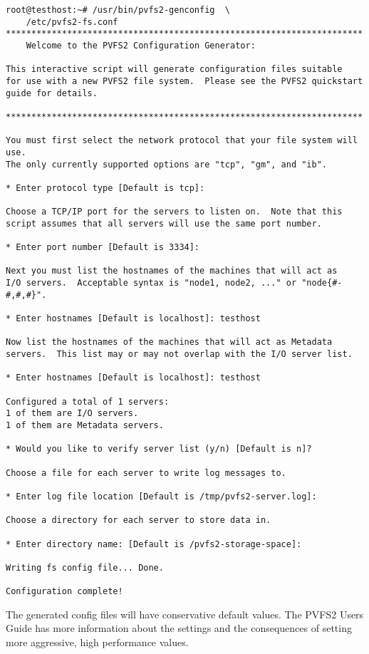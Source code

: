 \documentclass[11pt, letterpaper]{article}
\begin{document}
\begin{verbatim}
root@testhost:~# /usr/bin/pvfs2-genconfig  \
	/etc/pvfs2-fs.conf
**********************************************************************
	Welcome to the PVFS2 Configuration Generator:

This interactive script will generate configuration files suitable
for use with a new PVFS2 file system.  Please see the PVFS2 quickstart
guide for details.

**********************************************************************

You must first select the network protocol that your file system will use.
The only currently supported options are "tcp", "gm", and "ib".

* Enter protocol type [Default is tcp]: 

Choose a TCP/IP port for the servers to listen on.  Note that this
script assumes that all servers will use the same port number.

* Enter port number [Default is 3334]: 

Next you must list the hostnames of the machines that will act as
I/O servers.  Acceptable syntax is "node1, node2, ..." or "node{#-#,#,#}".

* Enter hostnames [Default is localhost]: testhost

Now list the hostnames of the machines that will act as Metadata
servers.  This list may or may not overlap with the I/O server list.

* Enter hostnames [Default is localhost]: testhost

Configured a total of 1 servers:
1 of them are I/O servers.
1 of them are Metadata servers.

* Would you like to verify server list (y/n) [Default is n]? 

Choose a file for each server to write log messages to.

* Enter log file location [Default is /tmp/pvfs2-server.log]: 

Choose a directory for each server to store data in.

* Enter directory name: [Default is /pvfs2-storage-space]: 

Writing fs config file... Done.

Configuration complete!
\end{verbatim}

The generated config files will have conservative default values.  The PVFS2
Users Guide has more information about the settings and the consequences of
setting more aggressive, high performance values.
\end{document}
